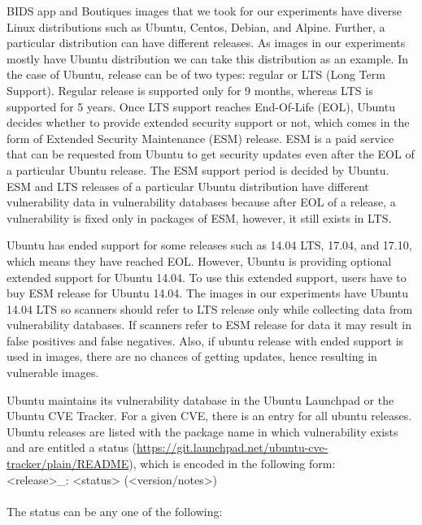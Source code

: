 \documentclass[a4paper,num-refs]{oup-contemporary}
\begin{document}
BIDS app and Boutiques images that we took for our experiments have diverse Linux
distributions such as Ubuntu, Centos, Debian, and Alpine. Further, a particular
distribution can have different releases. As images in our experiments mostly have
Ubuntu distribution we can take this distribution as an example. In the case of Ubuntu, release
can be of two types: regular or LTS (Long Term Support).
Regular release is supported only for 9 months, whereas LTS is supported for 5 years. Once LTS support
reaches End-Of-Life (EOL), Ubuntu decides whether to provide extended security support or not, which comes
in the form of Extended Security Maintenance (ESM) release.
ESM is a paid service that can be requested from Ubuntu to get security 
updates even after the EOL of a particular Ubuntu release. The ESM support period is decided by
Ubuntu. ESM and LTS releases of a particular Ubuntu distribution have different vulnerability
data in vulnerability databases because after EOL of a release, a vulnerability is fixed only in packages of ESM, however, it still
exists in LTS.

Ubuntu has ended support for some releases such as 14.04 LTS,
17.04, and 17.10, which means they have reached EOL. However, Ubuntu is providing optional extended support for Ubuntu 14.04.
To use this extended support, users have to buy ESM release for Ubuntu 14.04.
The images in our experiments have Ubuntu 14.04 LTS so scanners should refer
to LTS release only while collecting data from vulnerability databases. If scanners refer to ESM release for data it may result
in false positives and false negatives.
Also, if ubuntu release with ended support is used in images, there are no chances of getting updates, hence
resulting in vulnerable images. 

Ubuntu maintains its vulnerability database in the Ubuntu Launchpad or the Ubuntu CVE Tracker. For a given CVE, there is an entry for all ubuntu releases.
Ubuntu releases are listed with the package name
in which vulnerability exists and are entitled a status
(\href{https://git.launchpad.net/ubuntu-cve-tracker/plain/README}{https://git.launchpad.net/ubuntu-cve-tracker/plain/README}), which is
encoded in the following form:
\newline \\
\noindent <release>\_<source-package>: <status> (<version/notes>) \\
\newline\\
The status can be any one of the following:
\end{document}
